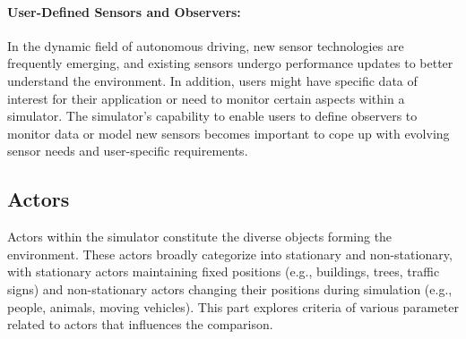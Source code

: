 \documentclass[12pt,twoside,a4paper,parskip]{scrbook} %
\begin{document}
\paragraph*{User-Defined Sensors and Observers:}
In the dynamic field of autonomous driving, new sensor technologies are frequently emerging, and existing sensors undergo performance updates to better understand the environment. In addition, users might have specific data of interest for their application or need to monitor certain aspects within a simulator. The simulator's capability to enable users to define observers to monitor data or model new sensors becomes important to cope up with evolving sensor needs and user-specific requirements.

\subsection{Actors}
Actors within the simulator constitute the diverse objects forming the environment. These actors broadly categorize into stationary and non-stationary, with stationary actors maintaining fixed positions (e.g., buildings, trees, traffic signs) and non-stationary actors changing their positions during simulation (e.g., people, animals, moving vehicles). This part explores criteria of various parameter related to actors that influences the comparison. 
\end{document}
